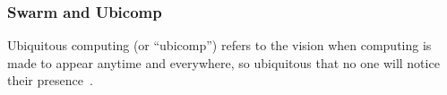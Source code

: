 \subsubsection{Swarm and Ubicomp}
\label{sec:swarm-wsn}

Ubiquitous computing (or ``ubicomp'') refers to the vision when computing is
made to appear anytime and everywhere, so ubiquitous that no one will notice
their presence~\cite{weiser1993ubiquitous}.


